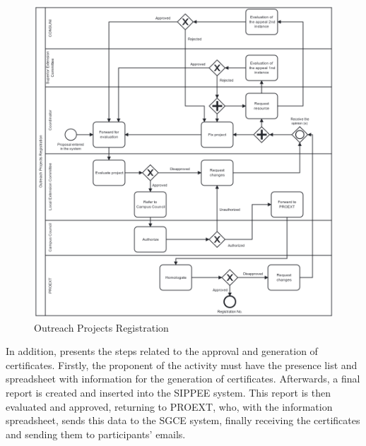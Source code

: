 \begin{figure}[!htb]
  \caption{Outreach Projects Registration}\label{fig:outreach-projects-registration}
  \begin{center}
    \includegraphics[width=16cm]{img/3-registroDeProjetosDeExtensaoV3.png}
  \end{center}
\end{figure}

In addition,  presents the steps related to the approval and generation of certificates. Firstly, the proponent of the activity must have the presence list and spreadsheet with information for the generation of certificates. Afterwards, a final report is created and inserted into the \ac{SIPPEE} system. This report is then evaluated and approved, returning to \ac{PROEXT}, who, with the information spreadsheet, sends this data to the \ac{SGCE} system, finally receiving the certificates and sending them to participants' emails.

